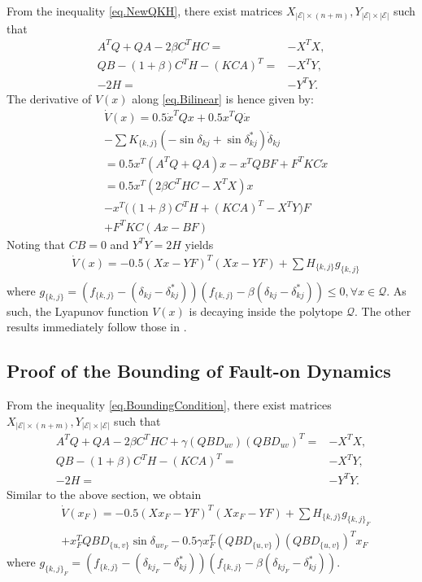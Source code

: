 \documentclass[final]{IEEEtran}
\begin{document}
From  the inequality \eqref{eq.NewQKH}, there exist matrices
$X_{|\mathcal{E}| \times (n+m)}, Y_{|\mathcal{E}|
\times|\mathcal{E}|}$
  such that
\begin{align}
  A^TQ+QA -2\beta C^THC = & -X^TX, \nonumber \\
  QB-(1+\beta)C^TH-(KCA)^T = &-X^TY, \nonumber \\
  -2H =& -Y^TY. \nonumber
\end{align}
The derivative of $V(x)$ along \eqref{eq.Bilinear} is hence given
by:
\begin{align}
    &\dot{V}(x) = 0.5\dot{x}^T Q x+ 0.5x ^T Q\dot{x} \nonumber \\
    &-\sum K_{\{k,j\}}(-\sin\delta_{{kj}}+\sin\delta_{kj}^*)\dot{\delta}_{{kj}}
    \nonumber \\ &=0.5x^T(A^TQ+QA)x-x^TQBF   + F^TKC\dot{x} \nonumber \\
    &=0.5x^T(2\beta C^THC-X^TX)x  \nonumber \\ &- x^T\big((1+\beta)C^TH+(KCA)^T-X^TY\big)F
     \nonumber \\ &+ F^TKC(Ax-BF)
\end{align}
Noting that $CB=0$ and $Y^TY=2H$ yields
\begin{align}
 &\dot{V}(x)=-0.5(Xx-YF)^T(Xx-YF)    + \sum H_{\{k,j\}}g_{\{k,j\}} \nonumber \\
  \end{align}
where
$g_{\{k,j\}}=(f_{\{k,j\}}-(\delta_{kj}-\delta_{kj}^*))(f_{\{k,j\}}-\beta(\delta_{kj}-\delta_{kj}^*))
\le 0, \forall x\in \mathcal{Q}.$ As such, the Lyapunov function
$V(x)$ is decaying inside the polytope $\mathcal{Q}.$ The other
results immediately follow those in \cite{Vu:2014}.



\subsection{Proof of the Bounding of Fault-on Dynamics}
\label{appendix.BoundingCondition}

From  the inequality \eqref{eq.BoundingCondition}, there exist
matrices $X_{|\mathcal{E}| \times (n+m)}, Y_{|\mathcal{E}|
\times|\mathcal{E}|}$
  such that
\begin{align}
  A^TQ+QA -2\beta C^THC+ \gamma (QBD_{uv})(QBD_{uv})^T = & -X^TX, \nonumber \\
  QB-(1+\beta)C^TH-(KCA)^T = &-X^TY, \nonumber \\
  -2H =& -Y^TY. \nonumber
\end{align}
Similar to the above section, we obtain
\begin{align}
\label{eq.dotV} &\dot{V}(x_F)=-0.5(Xx_F-YF)^T(Xx_F-YF)    + \sum H_{\{k,j\}}g_{\{k,j\}_F} \nonumber \\
    & +x_F^TQBD_{\{u,v\}}\sin\delta_{uv_F}-0.5\gamma x_F^T(QBD_{\{u,v\}})(QBD_{\{u,v\}})^Tx_F
  \end{align}
where
$g_{\{k,j\}_F}=(f_{\{k,j\}}-(\delta_{kj_F}-\delta_{kj}^*))(f_{\{k,j\}}-\beta(\delta_{kj_F}-\delta_{kj}^*)).$
\end{document}
